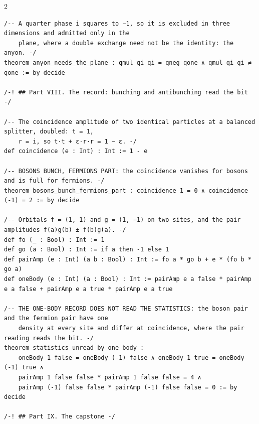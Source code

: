\documentclass[10pt]{article}
\begin{document}
\begin{multicols}{2}
\begin{Verbatim}[fontsize=\fontsize{6.0}{6.9}\selectfont,breaklines,breakanywhere,breaksymbolleft={}]
/-- A quarter phase i squares to −1, so it is excluded in three dimensions and admitted only in the
    plane, where a double exchange need not be the identity: the anyon. -/
theorem anyon_needs_the_plane : qmul qi qi = qneg qone ∧ qmul qi qi ≠ qone := by decide

/-! ## Part VIII. The record: bunching and antibunching read the bit -/

/-- The coincidence amplitude of two identical particles at a balanced splitter, doubled: t = 1,
    r = i, so t·t + ε·r·r = 1 − ε. -/
def coincidence (e : Int) : Int := 1 - e

/-- BOSONS BUNCH, FERMIONS PART: the coincidence vanishes for bosons and is full for fermions. -/
theorem bosons_bunch_fermions_part : coincidence 1 = 0 ∧ coincidence (-1) = 2 := by decide

/-- Orbitals f = (1, 1) and g = (1, −1) on two sites, and the pair amplitudes f(a)g(b) ± f(b)g(a). -/
def fo (_ : Bool) : Int := 1
def go (a : Bool) : Int := if a then -1 else 1
def pairAmp (e : Int) (a b : Bool) : Int := fo a * go b + e * (fo b * go a)
def oneBody (e : Int) (a : Bool) : Int := pairAmp e a false * pairAmp e a false + pairAmp e a true * pairAmp e a true

/-- THE ONE-BODY RECORD DOES NOT READ THE STATISTICS: the boson pair and the fermion pair have one
    density at every site and differ at coincidence, where the pair reading reads the bit. -/
theorem statistics_unread_by_one_body :
    oneBody 1 false = oneBody (-1) false ∧ oneBody 1 true = oneBody (-1) true ∧
    pairAmp 1 false false * pairAmp 1 false false = 4 ∧
    pairAmp (-1) false false * pairAmp (-1) false false = 0 := by decide

/-! ## Part IX. The capstone -/


\end{Verbatim}
\end{multicols}
\end{document}
